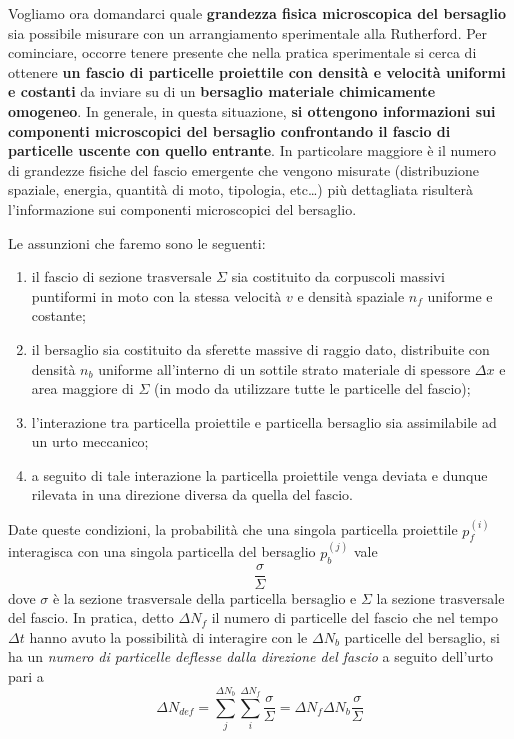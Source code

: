 Vogliamo ora domandarci quale \textbf{grandezza fisica microscopica del
bersaglio} sia possibile misurare con un arrangiamento sperimentale alla
Rutherford.
Per cominciare, occorre tenere presente che nella pratica
sperimentale si cerca di ottenere \textbf{un fascio di particelle
proiettile con densità e velocità uniformi e costanti} da inviare su di
un \textbf{bersaglio materiale chimicamente omogeneo}.
In generale, in
questa situazione, \textbf{si ottengono informazioni sui componenti
microscopici del bersaglio confrontando il fascio di particelle uscente
con quello entrante}.
In particolare maggiore è il numero di grandezze
fisiche del fascio emergente che vengono misurate (distribuzione
spaziale, energia, quantità di moto, tipologia, etc\ldots) più
dettagliata risulterà l'informazione sui componenti microscopici del
bersaglio.

Le assunzioni che faremo sono le seguenti:
\begin{enumerate}
	\tightlist
	\item
	il fascio di sezione trasversale \(\Sigma\) sia costituito da
	corpuscoli massivi puntiformi in moto con la stessa velocità \(v\) e
	densità spaziale \(n_f\) uniforme e costante;
	\item il bersaglio sia costituito da sferette massive di raggio dato,
	distribuite con densità \(n_b\) uniforme all'interno di un sottile
	strato materiale di spessore \(\Delta x\) e area maggiore di
	\(\Sigma\) (in modo da utilizzare tutte le particelle del fascio);
	\item
	l'interazione tra particella proiettile e particella bersaglio sia
	assimilabile ad un urto meccanico;
	\item
	a seguito di tale interazione la particella proiettile venga deviata e
	dunque rilevata in una direzione diversa da quella del fascio.
\end{enumerate}
Date queste condizioni, la probabilità che una singola particella
proiettile $ p^{(i)}_f$ interagisca con una singola particella del bersaglio $ p^{(j)}_b$ vale
\[
	\frac{\sigma}{\Sigma}
\]
dove \(\sigma\) è la sezione trasversale della particella bersaglio e \(\Sigma\) la sezione trasversale del fascio.
In pratica, detto \(\Delta N_f\) il numero di particelle del fascio che nel tempo \(\Delta t\) hanno avuto la
possibilità di interagire con le \(\Delta N_b\) particelle del bersaglio, si ha un \emph{numero di particelle deflesse
dalla direzione del fascio} a seguito dell'urto pari a
\[
	\Delta N_{def} = \sum_{j}^{\Delta N_b} \sum_{i}^{\Delta N_f} \frac{\sigma}{\Sigma}=
	\Delta N_f \Delta N_b \frac{\sigma}{\Sigma}
\]

